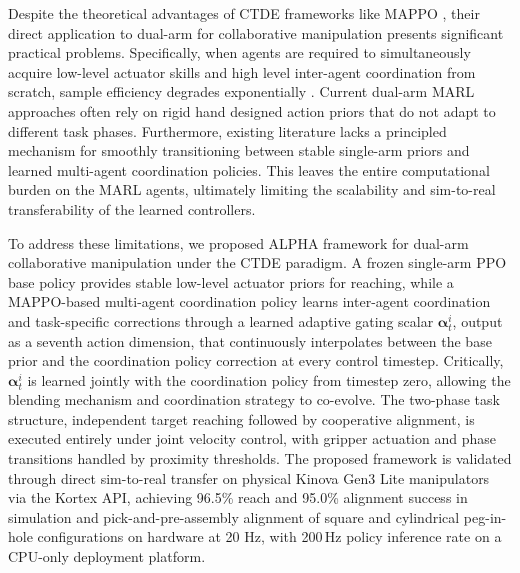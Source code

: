 \documentclass[lettersize,journal]{IEEEtran}
\begin{document}
Despite the theoretical advantages of CTDE frameworks like MAPPO \cite{MAPPO}, their direct application to dual-arm for collaborative manipulation presents significant practical problems. Specifically, when agents are required to simultaneously acquire low-level actuator skills and high level inter-agent coordination from scratch, sample efficiency degrades exponentially \cite{intro-26, intro-27}. Current dual-arm MARL approaches often rely on rigid hand designed action priors that do not adapt to different task phases. Furthermore, existing literature lacks a principled mechanism for smoothly transitioning between stable single-arm priors and learned multi-agent coordination policies. This leaves the entire computational burden on the MARL agents, ultimately limiting the scalability and sim-to-real transferability of the learned controllers.

To address these limitations, we proposed ALPHA framework for dual-arm collaborative manipulation under the CTDE paradigm. A frozen single-arm PPO base policy provides stable low-level actuator priors for reaching, while a MAPPO-based multi-agent coordination policy learns inter-agent coordination and task-specific corrections through a learned adaptive gating scalar $\mathbf{\alpha}^{i}_{t}$, output as a seventh action dimension, that continuously interpolates between the base prior and the coordination policy correction at every control timestep. Critically, $\mathbf{\alpha}^{i}_{t}$ is learned jointly with the coordination policy from timestep zero, allowing the blending mechanism and coordination strategy to co-evolve. The two-phase task structure, independent target reaching followed by cooperative alignment, is executed entirely under joint velocity control, with gripper actuation and phase transitions handled by proximity thresholds. The proposed framework is validated through direct sim-to-real transfer on physical Kinova Gen3 Lite manipulators via the Kortex API, achieving 96.5\% reach and 95.0\% alignment success in simulation and pick-and-pre-assembly alignment of square and cylindrical peg-in-hole configurations on hardware at 20 Hz, with 200\,Hz policy inference rate on a CPU-only deployment platform.
\end{document}
